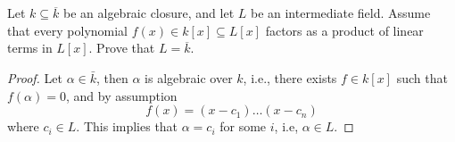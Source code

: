 \documentclass[openany]{book}
\begin{document}






\section{}


\begin{prob}
    Let \( k \subseteq \overline{k} \) be an algebraic closure, and let \( L \) be an intermediate field. Assume that every polynomial \( f(x) \in k[x] \subseteq L[x] \) factors as a product of linear terms in \( L[x] \). Prove that \( L = \overline{k} \).
    \end{prob}
\begin{proof}
    Let $\alpha\in\bar{k}$, then $\alpha$ is algebraic over $k$, i.e., there exists $f\in k[x]$ such that $f(\alpha)=0$, and by assumption
    \begin{equation*}
        f(x)=(x-c_1)\dots (x-c_n)
    \end{equation*}
    where $c_i\in L$. This implies that $\alpha=c_i$ for some $i$, i.e, $\alpha\in L$. 
\end{proof}
\end{document}
